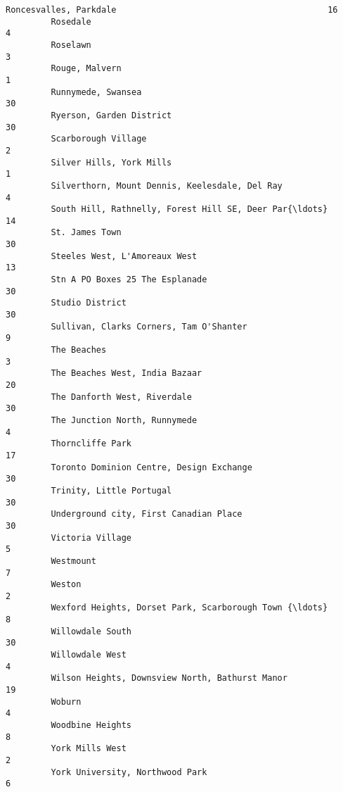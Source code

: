 \documentclass[11pt]{article}
\begin{document}
\begin{Verbatim}[commandchars=\\\{\}]
         Roncesvalles, Parkdale                                          16  
         Rosedale                                                         4  
         Roselawn                                                         3  
         Rouge, Malvern                                                   1  
         Runnymede, Swansea                                              30  
         Ryerson, Garden District                                        30  
         Scarborough Village                                              2  
         Silver Hills, York Mills                                         1  
         Silverthorn, Mount Dennis, Keelesdale, Del Ray                   4  
         South Hill, Rathnelly, Forest Hill SE, Deer Par{\ldots}              14  
         St. James Town                                                  30  
         Steeles West, L'Amoreaux West                                   13  
         Stn A PO Boxes 25 The Esplanade                                 30  
         Studio District                                                 30  
         Sullivan, Clarks Corners, Tam O'Shanter                          9  
         The Beaches                                                      3  
         The Beaches West, India Bazaar                                  20  
         The Danforth West, Riverdale                                    30  
         The Junction North, Runnymede                                    4  
         Thorncliffe Park                                                17  
         Toronto Dominion Centre, Design Exchange                        30  
         Trinity, Little Portugal                                        30  
         Underground city, First Canadian Place                          30  
         Victoria Village                                                 5  
         Westmount                                                        7  
         Weston                                                           2  
         Wexford Heights, Dorset Park, Scarborough Town {\ldots}               8  
         Willowdale South                                                30  
         Willowdale West                                                  4  
         Wilson Heights, Downsview North, Bathurst Manor                 19  
         Woburn                                                           4  
         Woodbine Heights                                                 8  
         York Mills West                                                  2  
         York University, Northwood Park                                  6  
\end{Verbatim}
            
\end{document}

